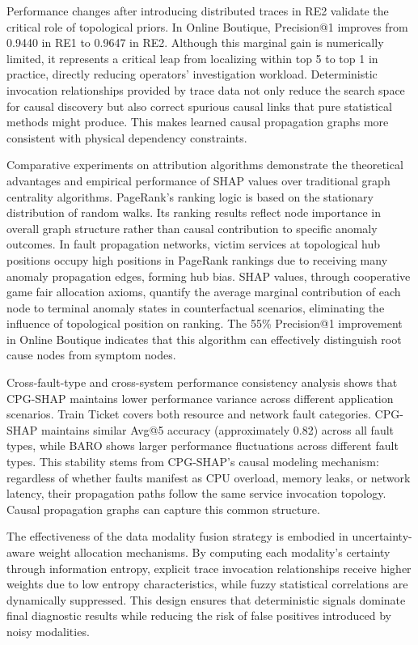 \documentclass[conference]{IEEEtran}
\begin{document}
Performance changes after introducing distributed traces in RE2 validate the critical role of topological priors. In Online Boutique, Precision@1 improves from 0.9440 in RE1 to 0.9647 in RE2. Although this marginal gain is numerically limited, it represents a critical leap from localizing within top 5 to top 1 in practice, directly reducing operators' investigation workload. Deterministic invocation relationships provided by trace data not only reduce the search space for causal discovery but also correct spurious causal links that pure statistical methods might produce. This makes learned causal propagation graphs more consistent with physical dependency constraints.

Comparative experiments on attribution algorithms demonstrate the theoretical advantages and empirical performance of SHAP values over traditional graph centrality algorithms. PageRank's ranking logic is based on the stationary distribution of random walks. Its ranking results reflect node importance in overall graph structure rather than causal contribution to specific anomaly outcomes. In fault propagation networks, victim services at topological hub positions occupy high positions in PageRank rankings due to receiving many anomaly propagation edges, forming hub bias. SHAP values, through cooperative game fair allocation axioms, quantify the average marginal contribution of each node to terminal anomaly states in counterfactual scenarios, eliminating the influence of topological position on ranking. The 55\% Precision@1 improvement in Online Boutique indicates that this algorithm can effectively distinguish root cause nodes from symptom nodes.

Cross-fault-type and cross-system performance consistency analysis shows that CPG-SHAP maintains lower performance variance across different application scenarios. Train Ticket covers both resource and network fault categories. CPG-SHAP maintains similar Avg@5 accuracy (approximately 0.82) across all fault types, while BARO shows larger performance fluctuations across different fault types. This stability stems from CPG-SHAP's causal modeling mechanism: regardless of whether faults manifest as CPU overload, memory leaks, or network latency, their propagation paths follow the same service invocation topology. Causal propagation graphs can capture this common structure.

The effectiveness of the data modality fusion strategy is embodied in uncertainty-aware weight allocation mechanisms. By computing each modality's certainty through information entropy, explicit trace invocation relationships receive higher weights due to low entropy characteristics, while fuzzy statistical correlations are dynamically suppressed. This design ensures that deterministic signals dominate final diagnostic results while reducing the risk of false positives introduced by noisy modalities.
\end{document}
